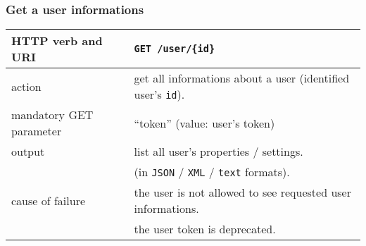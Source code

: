 \subsubsection{Get a user informations}
\begin{tabular}{ | l | l | }
	\hline
	HTTP verb and URI & \texttt{GET /user/\{id\}} \\
	\hline
	action & get all informations about a user (identified \via user's \texttt{id}). \\
	\hline
	mandatory GET parameter & ``token'' (value: user's token) \\
	\hline
	output & list all user's properties / settings.  \\
	\space & (in \texttt{JSON} / \texttt{XML} / \texttt{text} formats). \\
	\hline
	cause of failure & the user is not allowed to see requested user informations. \\
	\space & the user token is deprecated. \\
	\hline
\end{tabular}
\newline

